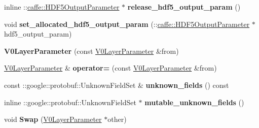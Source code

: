 \begin{DoxyCompactItemize}
\item 
\mbox{\label{classcaffe_1_1_v0_layer_parameter_ad0cb48df757809160c5c97e0d83145e6}} 
inline \+::\mbox{\hyperlink{classcaffe_1_1_h_d_f5_output_parameter}{caffe\+::\+H\+D\+F5\+Output\+Parameter}} $\ast$ {\bfseries release\+\_\+hdf5\+\_\+output\+\_\+param} ()
\item 
\mbox{\label{classcaffe_1_1_v0_layer_parameter_a25f1bee20425c0afd3fb87736450c172}} 
void {\bfseries set\+\_\+allocated\+\_\+hdf5\+\_\+output\+\_\+param} (\+::\mbox{\hyperlink{classcaffe_1_1_h_d_f5_output_parameter}{caffe\+::\+H\+D\+F5\+Output\+Parameter}} $\ast$hdf5\+\_\+output\+\_\+param)
\item 
\mbox{\label{classcaffe_1_1_v0_layer_parameter_abe389effb612bfceadc41f5eefade0bd}} 
{\bfseries V0\+Layer\+Parameter} (const \mbox{\hyperlink{classcaffe_1_1_v0_layer_parameter}{V0\+Layer\+Parameter}} \&from)
\item 
\mbox{\label{classcaffe_1_1_v0_layer_parameter_ad077adadfad6e5c23799b6e0b3e7c6d5}} 
\mbox{\hyperlink{classcaffe_1_1_v0_layer_parameter}{V0\+Layer\+Parameter}} \& {\bfseries operator=} (const \mbox{\hyperlink{classcaffe_1_1_v0_layer_parameter}{V0\+Layer\+Parameter}} \&from)
\item 
\mbox{\label{classcaffe_1_1_v0_layer_parameter_a1a7ca01f6dca09db851c8627f7b6cd17}} 
const \+::google\+::protobuf\+::\+Unknown\+Field\+Set \& {\bfseries unknown\+\_\+fields} () const
\item 
\mbox{\label{classcaffe_1_1_v0_layer_parameter_a8f1e196157e0756656c38c31cd9f6be0}} 
inline \+::google\+::protobuf\+::\+Unknown\+Field\+Set $\ast$ {\bfseries mutable\+\_\+unknown\+\_\+fields} ()
\item 
\mbox{\label{classcaffe_1_1_v0_layer_parameter_ace771d565cdf95729b78b260cc89d795}} 
void {\bfseries Swap} (\mbox{\hyperlink{classcaffe_1_1_v0_layer_parameter}{V0\+Layer\+Parameter}} $\ast$other)
\item 
\mbox{\label{classcaffe_1_1_v0_layer_parameter_adc90383887e68f8013ff57ca86e26c76}} 

\end{DoxyCompactItemize}
